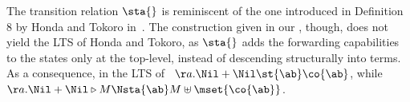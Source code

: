
The transition relation $\sta{}$ is reminiscent of the one introduced
in Definition 8 by Honda and
  Tokoro in~\cite{DBLP:conf/ecoop/HondaT91}.  The construction given in
our , though, does not yield the LTS of Honda and Tokoro,
as $\sta{}$ adds the forwarding capabilities to the states only at the
top-level, instead of descending structurally into terms. As a
consequence, in the LTS of~\cite{DBLP:conf/ecoop/HondaT91}
$\aa.\Nil + \Nil \st{ \ab } \co{ \ab }$, while
$\aa.\Nil + \Nil \triangleright M \Nsta{ \ab } M \uplus \mset{ \co{ \ab } }$.


